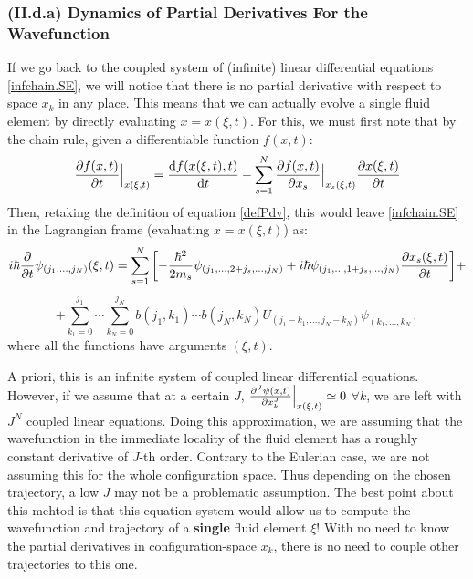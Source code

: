 \documentclass[11pt, a4paper]{article} %
\begin{document}
\subsubsection*{(II.d.a) Dynamics of Partial Derivatives For the Wavefunction}\vspace{-0.1cm}

If we go back to the coupled system of (infinite) linear differential equations \eqref{infchain.SE}, we will notice that there is no partial derivative with respect to space $x_k$ in any place. This means that we can actually evolve a single fluid element by directly evaluating $x=x(\xi,t)$. For this, we must first note that by the chain rule, given a differentiable function $f(x,t)$:
\begin{equation}\label{ruler}
\pdv{f(x,t)}{t}\Big\rvert_{x(\xi,t)} = \dv{f(x(\xi,t),t)}{t}-\sum_{s=1}^N \pdv{f(x,t)}{x_s}\Big\rvert_{x_s(\xi,t)}\pdv{x(\xi,t)}{t}
\end{equation}
Then, retaking the definition of equation \eqref{defPdv}, this would leave \eqref{infchain.SE} in the Lagrangian frame (evaluating $x=x(\xi,t)$) as:\vspace{-0.1cm}
\begin{equation}\label{infchain.SE}
i\hbar \pdv{}{t}\psi_{(j_1,...,j_N)}(\xi,t)=\sum_{s=1}^N\qty[-\frac{\hbar^2}{2m_s}\psi_{(j_1,...,2+j_s,...,j_N)}+i\hbar \psi_{(j_1,...,1+j_s,...,j_N)} \pdv{x_s(\xi,t)}{t}]+\vspace{-0.1cm}
\end{equation}
$$
+\sum_{k_1=0}^{j_1}\cdots\sum_{k_N=0}^{j_N} b(j_1,k_1)\cdots b(j_N,k_N)U_{(j_1-k_1,...,j_N-k_N)}\psi_{(k_1,...,k_N)}
$$
where all the functions have arguments $(\xi,t)$.

A priori, this is an infinite system of coupled linear differential equations. However, if we assume that at a certain $J$, $\pdv[J]{\psi(x,t)}{x_k}\Big\rvert_{x(\xi,t)}\simeq 0$  $\forall k$, we are left with $J^N$ coupled linear equations. Doing this approximation, we are assuming that the wavefunction in the immediate locality of the fluid element has a roughly constant derivative of $J$-th order. Contrary to the Eulerian case, we are not assuming this for the whole configuration space. Thus depending on the chosen trajectory, a low $J$ may not be a problematic assumption. The best point about this mehtod is that this equation system would allow us to compute the wavefunction and trajectory of a {\bf single} fluid element $\xi$! With no need to know the partial derivatives in configuration-space $x_k$, there is no need to couple other trajectories to this one.
\end{document}
